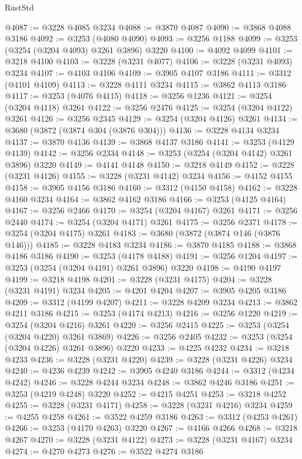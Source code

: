 \begin{lexlean}{RustStd}
\begin{coremodule}
{\begin{coremodule}
{{{{{{{{{{{{{{{{{{{{{{{{{{{{{{{{{{{{{@4087 := @3228 @4085 @3234
@4088 := @3870 @4087
@4090 := @3868 @4088 @3186
@4092 := @3253 (@4080 @4090)
@4093 := @3256 @1188
@4099 := @3253 (@3254 (@3204 @4093) @3261 @3896) @3220
@4100 := @4092 @4099
@4101 := @3218 @4100
@4103 := @3228 (@3231 @4077)
@4106 := @3228 (@3231 @4093) @3234
@4107 := @4103 @4106
@4109 := @3905 @4107 @3186
@4111 := @3312 (@4101 @4109)
@4113 := @3228 @4111 @3234
@4115 := @3862 @4113 @3186
@4117 := @3253 (@4076 @4115)
@4118 := @3256 @1236
@4121 := @3254 (@3204 @4118) @3261
@4122 := @3256 @2476
@4125 := @3254 (@3204 @4122) @3261
@4126 := @3256 @2345
@4129 := @3254 (@3204 @4126) @3261
@4134 := @3680 (@3872 (@3874 @304 (@3876 @304)))
@4136 := @3228 @4134 @3234
@4137 := @3870 @4136
@4139 := @3868 @4137 @3186
@4141 := @3253 (@4129 @4139)
@4142 := @3256 @2334
@4148 := @3253 (@3254 (@3204 @4142) @3261 @3896) @3220
@4149 := @4141 @4148
@4150 := @3218 @4149
@4152 := @3228 (@3231 @4126)
@4155 := @3228 (@3231 @4142) @3234
@4156 := @4152 @4155
@4158 := @3905 @4156 @3186
@4160 := @3312 (@4150 @4158)
@4162 := @3228 @4160 @3234
@4164 := @3862 @4162 @3186
@4166 := @3253 (@4125 @4164)
@4167 := @3256 @2466
@4170 := @3254 (@3204 @4167) @3261
@4171 := @3256 @2440
@4174 := @3254 (@3204 @4171) @3261
@4175 := @3256 @2371
@4178 := @3254 (@3204 @4175) @3261
@4183 := @3680 (@3872 (@3874 @146 (@3876 @146)))
@4185 := @3228 @4183 @3234
@4186 := @3870 @4185
@4188 := @3868 @4186 @3186
@4190 := @3253 (@4178 @4188)
@4191 := @3256 @1204
@4197 := @3253 (@3254 (@3204 @4191) @3261 @3896) @3220
@4198 := @4190 @4197
@4199 := @3218 @4198
@4201 := @3228 (@3231 @4175)
@4204 := @3228 (@3231 @4191) @3234
@4205 := @4201 @4204
@4207 := @3905 @4205 @3186
@4209 := @3312 (@4199 @4207)
@4211 := @3228 @4209 @3234
@4213 := @3862 @4211 @3186
@4215 := @3253 (@4174 @4213)
@4216 := @3256 @1220
@4219 := @3254 (@3204 @4216) @3261
@4220 := @3256 @2415
@4225 := @3253 (@3254 (@3204 @4220) @3261 @3869)
@4226 := @3256 @2405
@4232 := @3253 (@3254 (@3204 @4226) @3261 @3896) @3220
@4233 := @4225 @4232
@4234 := @3218 @4233
@4236 := @3228 (@3231 @4220)
@4239 := @3228 (@3231 @4226) @3234
@4240 := @4236 @4239
@4242 := @3905 @4240 @3186
@4244 := @3312 (@4234 @4242)
@4246 := @3228 @4244 @3234
@4248 := @3862 @4246 @3186
@4251 := @3253 (@4219 @4248) @3220
@4252 := @4215 @4251
@4253 := @3218 @4252
@4255 := @3228 (@3231 @4171)
@4258 := @3228 (@3231 @4216) @3234
@4259 := @4255 @4258
@4261 := @3522 @4259 @3186
@4263 := @3312 (@4253 @4261)
@4266 := @3253 (@4170 @4263) @3220
@4267 := @4166 @4266
@4268 := @3218 @4267
@4270 := @3228 (@3231 @4122)
@4273 := @3228 (@3231 @4167) @3234
@4274 := @4270 @4273
@4276 := @3522 @4274 @3186
}}}}}}}}}}}}}}}}}}}}}}}}}}}}}}}}}}}}}
\end{coremodule}}
\end{coremodule}
\end{lexlean}
